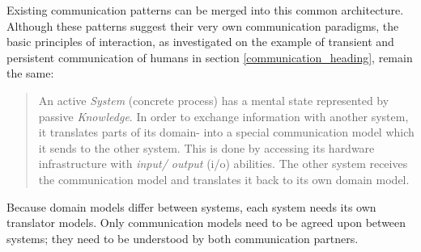 Existing communication patterns can be merged into this common architecture.
Although these patterns suggest their very own communication paradigms, the
basic principles of interaction, as investigated on the example of transient
and persistent communication of humans in section \ref{communication_heading},
remain the same:

\begin{quote}
    An active \emph{System} (concrete process) has a mental state represented
    by passive \emph{Knowledge}. In order to exchange information with another
    system, it translates parts of its domain- into a special communication
    model which it sends to the other system. This is done by accessing its
    hardware infrastructure with \emph{input/ output} (i/o) abilities. The
    other system receives the communication model and translates it back to its
    own domain model.
\end{quote}

Because domain models differ between systems, each system needs its own
translator models. Only communication models need to be agreed upon between
systems; they need to be understood by both communication partners.
